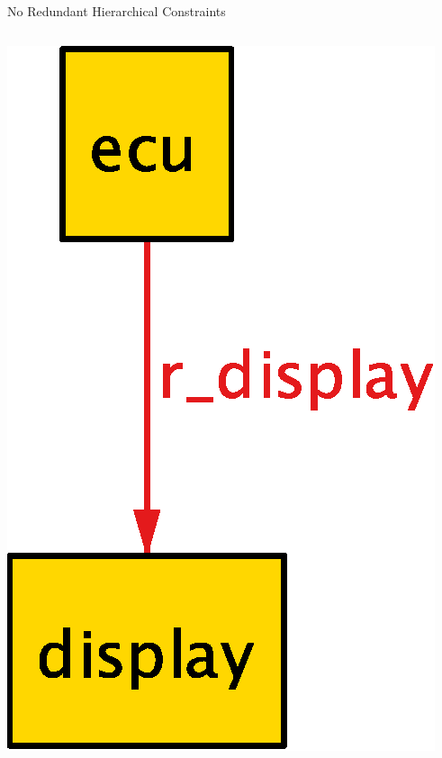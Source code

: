 \documentclass[table,15pt,t]{beamer}
\newcounter{i}
\begin{document}
\begin{frame}{No Redundant Hierarchical Constraints}
\begin{columns}
\begin{column}{0.5\textwidth}
      \includegraphics[scale=0.5]{figs/parent-new}
    \end{column}
  \end{columns}
\end{frame}
\end{document}
